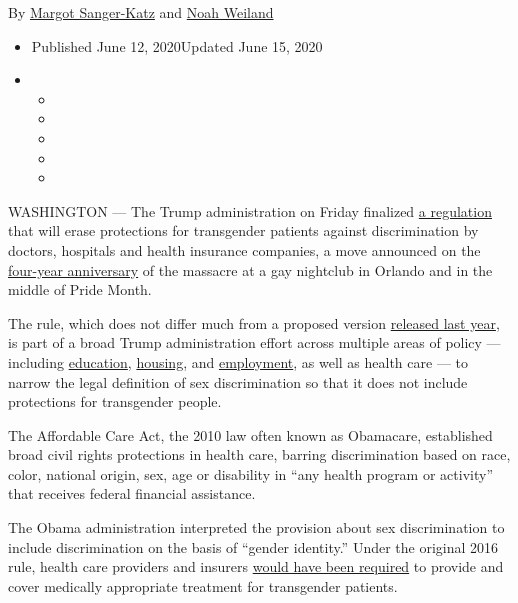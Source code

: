 By
\href{https://www.nytimes3xbfgragh.onion/by/margot-sanger-katz}{Margot
Sanger-Katz} and
\href{https://www.nytimes3xbfgragh.onion/by/noah-weiland}{Noah Weiland}

\begin{itemize}
\item
  Published June 12, 2020Updated June 15, 2020
\item
  \begin{itemize}
  \item
  \item
  \item
  \item
  \item
  \end{itemize}
\end{itemize}

WASHINGTON --- The Trump administration on Friday finalized
\href{https://www.hhs.gov/sites/default/files/1557-final-rule.pdf}{a
regulation} that will erase protections for transgender patients against
discrimination by doctors, hospitals and health insurance companies, a
move announced on the
\href{https://www.nytimes3xbfgragh.onion/2016/06/13/us/orlando-nightclub-shooting.html}{four-year
anniversary} of the massacre at a gay nightclub in Orlando and in the
middle of Pride Month.

The rule, which does not differ much from a proposed version
\href{https://www.nytimes3xbfgragh.onion/2019/05/24/us/politics/donald-trump-transgender-protections.html}{released
last year}, is part of a broad Trump administration effort across
multiple areas of policy --- including
\href{https://www.nytimes3xbfgragh.onion/2018/10/21/us/politics/transgender-trump-administration-sex-definition.html}{education},
\href{https://www.reginfo.gov/public/do/eAgendaViewRule?pubId=201904\&RIN=2506-AC53}{housing},
and
\href{https://www.nytimes3xbfgragh.onion/2019/04/22/us/politics/supreme-court-gay-transgender-employees.html}{employment},
as well as health care --- to narrow the legal definition of sex
discrimination so that it does not include protections for transgender
people.

The Affordable Care Act, the 2010 law often known as Obamacare,
established broad civil rights protections in health care, barring
discrimination based on race, color, national origin, sex, age or
disability in ``any health program or activity'' that receives federal
financial assistance.

The Obama administration interpreted the provision about sex
discrimination to include discrimination on the basis of ``gender
identity.'' Under the original 2016 rule, health care providers and
insurers
\href{https://www.nytimes3xbfgragh.onion/2015/09/04/us/health-care-rules-proposed-to-shield-transgender-patients-from-bias.html}{would
have been required} to provide and cover medically appropriate treatment
for transgender patients.

